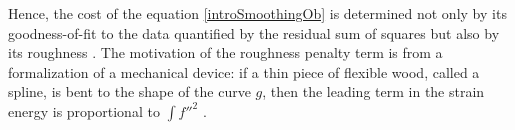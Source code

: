 Hence, the cost of the equation \eqref{introSmoothingOb} is determined not only by its goodness-of-fit to the data quantified by the residual sum of squares but also by its roughness \citep{schwarz2012geodesy}. The motivation of the roughness penalty term is from a formalization of a mechanical device: if a thin piece of flexible wood, called a spline, is bent to the shape of the curve $g$, then the leading term in the strain energy is proportional to $\int f''^2$ \citep{green1993nonparametric}. 


%
%
%
%
%



